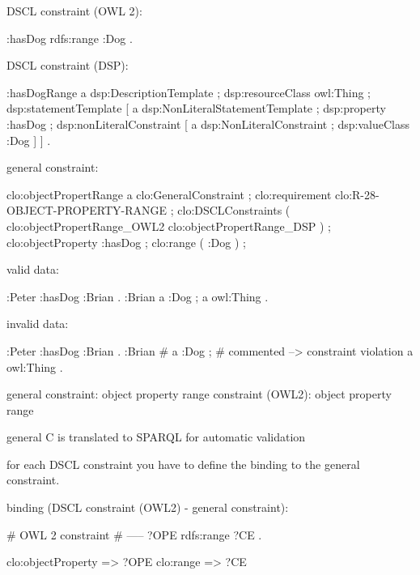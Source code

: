 \documentclass{llncs}
\begin{document}
DSCL constraint (OWL 2):
\begin{ex}
:hasDog rdfs:range :Dog . 
\end{ex}

DSCL constraint (DSP):
\begin{ex}
:hasDogRange
        a dsp:DescriptionTemplate ; 
        dsp:resourceClass owl:Thing ; 
        dsp:statementTemplate [
            a dsp:NonLiteralStatementTemplate ;
            dsp:property :hasDog ; 
            dsp:nonLiteralConstraint [ 
                a dsp:NonLiteralConstraint ;
                dsp:valueClass :Dog ] ] .
\end{ex}

general constraint:
\begin{ex}
clo:objectPropertRange
    a clo:GeneralConstraint ;
		clo:requirement clo:R-28-OBJECT-PROPERTY-RANGE ;
		clo:DSCLConstraints ( clo:objectPropertRange_OWL2 clo:objectPropertRange_DSP ) ;
		clo:objectProperty :hasDog ;
		clo:range ( :Dog ) ;
\end{ex}

valid data:
\begin{ex}
:Peter 
    :hasDog :Brian .
:Brian 
    a :Dog ;     
    a owl:Thing . 
\end{ex}

invalid data:
\begin{ex}
:Peter 
    :hasDog :Brian .
:Brian 
#   a :Dog ; # commented --> constraint violation
    a owl:Thing . 
\end{ex}

general constraint: object property range
constraint (OWL2): object property range

general C is translated to SPARQL for automatic validation

for each DSCL constraint you have to define the binding to the general constraint.

binding (DSCL constraint (OWL2) - general constraint):
\begin{ex}
# OWL 2 constraint
# -----
?OPE rdfs:range ?CE .

clo:objectProperty => ?OPE
clo:range => ?CE 
\end{ex}
\end{document}
